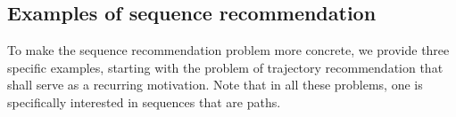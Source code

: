%
\subsection{Examples of sequence recommendation}
\label{sec:trajrec}

To make the sequence recommendation problem more concrete,
we provide three specific examples,
starting with the problem of trajectory recommendation
that shall serve as a recurring motivation.
Note that in all these problems, one is specifically interested in sequences that are paths.


